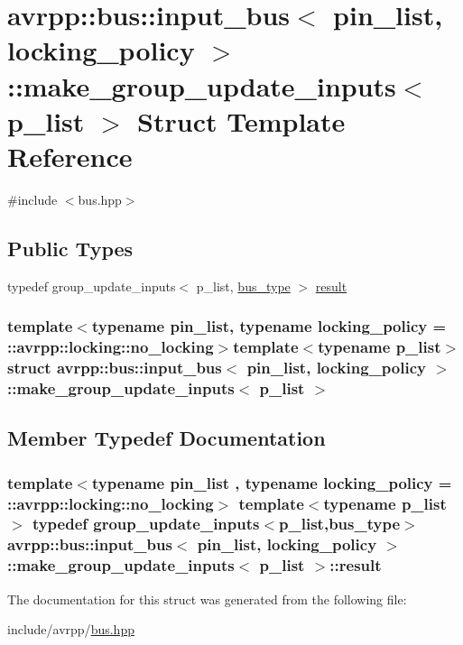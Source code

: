 \hypertarget{structavrpp_1_1bus_1_1input__bus_1_1make__group__update__inputs}{
\section{avrpp::bus::input\_\-bus$<$ pin\_\-list, locking\_\-policy $>$::make\_\-group\_\-update\_\-inputs$<$ p\_\-list $>$ Struct Template Reference}
\label{structavrpp_1_1bus_1_1input__bus_1_1make__group__update__inputs}
}


{\ttfamily \#include $<$bus.hpp$>$}

\subsection*{Public Types}
\begin{DoxyCompactItemize}
\item 
typedef group\_\-update\_\-inputs$<$ p\_\-list, \hyperlink{structavrpp_1_1bus_1_1input__bus_aa1146b9861eb713a67224e329e4244a9}{bus\_\-type} $>$ \hyperlink{structavrpp_1_1bus_1_1input__bus_1_1make__group__update__inputs_a0ff162f87fd07437541f4e83666e8389}{result}
\end{DoxyCompactItemize}
\subsubsection*{template$<$typename pin\_\-list, typename locking\_\-policy = ::avrpp::locking::no\_\-locking$>$template$<$typename p\_\-list$>$ struct avrpp::bus::input\_\-bus$<$ pin\_\-list, locking\_\-policy $>$::make\_\-group\_\-update\_\-inputs$<$ p\_\-list $>$}



\subsection{Member Typedef Documentation}
\hypertarget{structavrpp_1_1bus_1_1input__bus_1_1make__group__update__inputs_a0ff162f87fd07437541f4e83666e8389}{
\subsubsection[{result}]{\setlength{\rightskip}{0pt plus 5cm}template$<$typename pin\_\-list , typename locking\_\-policy  = ::avrpp::locking::no\_\-locking$>$ template$<$typename p\_\-list $>$ typedef group\_\-update\_\-inputs$<$p\_\-list,{\bf bus\_\-type}$>$ {\bf avrpp::bus::input\_\-bus}$<$ pin\_\-list, locking\_\-policy $>$::{\bf make\_\-group\_\-update\_\-inputs}$<$ p\_\-list $>$::{\bf result}}}
\label{structavrpp_1_1bus_1_1input__bus_1_1make__group__update__inputs_a0ff162f87fd07437541f4e83666e8389}


The documentation for this struct was generated from the following file:\begin{DoxyCompactItemize}
\item 
include/avrpp/\hyperlink{bus_8hpp}{bus.hpp}\end{DoxyCompactItemize}
